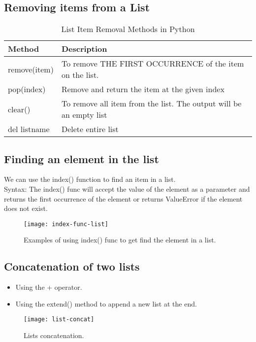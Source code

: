 \subsection{Removing items from a List}
\begin{table}[h!]
	\centering
	\begin{tabularx}{\textwidth}{|l|X|}
		\hline
		Method & Description \\
		\hline
		remove(item) & To remove THE FIRST OCCURRENCE of the item on the list. \\
		\hline
		pop(index) & Remove and return the item at the given index \\
		\hline
		clear() & To remove all item from the list. The output will be an empty list \\
		\hline
		del listname & Delete entire list \\
		\hline
\end{tabularx}
\caption{List Item Removal Methods in Python}
\label{tab:list-removal}
\end{table}

\subsection{Finding an element in the list}
We can use the index() function to find an item in a list. \\ [0.5em]
{\large Syntax:} The index() func will accept the value of the element as a parameter and returns the first occurrence of the element or returns ValueError if the element does not exist. \\
\newpage

\begin{figure}[h]
	\centering
	\texttt{[image: index-func-list]}
	\caption{Examples of using index() func to get find the element in a list.}
	\label{fig:index-func}
\end{figure}

\subsection{Concatenation of two lists}
\begin{itemize}
	\item Using the + operator.
	\item Using the extend() method to append a new list at the end.
\end{itemize}

\begin{figure}[h]
	\centering
	\texttt{[image: list-concat]}
	\caption{Lists concatenation.}
	\label{fig:list-concat}
\end{figure}

